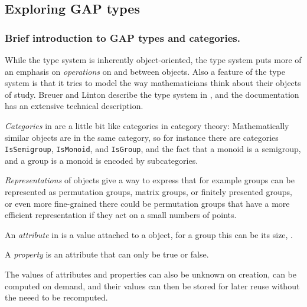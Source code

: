 \subsection{Exploring GAP types}

\subsubsection{Brief introduction to GAP types and categories.}\label{gap-types-intro}


While the \Sage type system is inherently object-oriented, the \GAP type
system puts more of an emphasis on \emph{operations} on and between objects.
Also a feature of the \GAP type system is that it tries to model the way
mathematicians think about their objects of study. Breuer and Linton describe
the \GAP type system in \cite{breuer-linton}, and the \GAP documentation \cite{} has
an extensive technical description.

\emph{Categories} in \GAP are a little bit like categories in category theory:
Mathematically similar objects are in the same category, so for instance
there are categories \texttt{IsSemigroup}, \texttt{IsMonoid}, and
\texttt{IsGroup}, and the fact that a monoid is a semigroup, and
a group is a monoid is encoded by subcategories. 

\emph{Representations} of objects give a way to express that for example
groups can be represented as permutation groups, matrix groups, or finitely
presented groups, or even more fine-grained there could be permutation groups
that have a more efficient representation if they act on a small numbers of
points.

An \emph{attribute} in \GAP is a value attached to a \GAP object, for
a group this can be its size,
.

A \emph{property} is an attribute that can only be true or false.

The values of attributes and properties can also be unknown on creation,
can be computed on demand, and their values can then be stored for later
reuse without the neeed to be recomputed.

